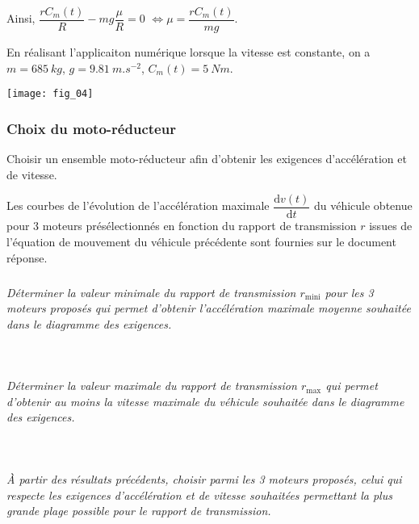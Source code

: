 \begin{multicols}{2}
\begin{corrige}
Ainsi, $\dfrac{rC_m(t)}{R}-mg\dfrac{\mu}{R}=0$ $ \Leftrightarrow \mu = \dfrac{rC_m(t)}{mg}$.

En réalisant l'applicaiton numérique lorsque la vitesse est constante, on a $m=\SI{685}{kg}$, $g=\SI{9,81}{m.s^{-2}}$, $C_m(t)=\SI{5}{Nm}$.
\end{corrige}
\else
\fi

\begin{center}
\texttt{[image: fig\_04]}
\end{center}


\subsubsection*{Choix du moto-réducteur}
\begin{obj}
Choisir un ensemble moto-réducteur afin d’obtenir les exigences d’accélération et de vitesse.
\end{obj}

Les courbes de l’évolution de l’accélération maximale $\dfrac{\text{d} v(t)}{\text{d} t}$
du véhicule obtenue pour 3 moteurs présélectionnés en fonction du rapport de transmission $r$ issues de l’équation de mouvement du véhicule précédente sont fournies sur le document réponse.




\subparagraph{}\textit{Déterminer la valeur minimale du rapport de transmission $r_{\text{mini}}$ pour les 3 moteurs proposés qui permet d’obtenir l’accélération maximale moyenne souhaitée dans le diagramme des exigences.}
\ifprof
\begin{corrige}~\\
\end{corrige}
\else
\fi


\subparagraph{}\textit{Déterminer la valeur maximale du rapport de transmission $r_{\text{max}}$ qui permet d’obtenir au moins la vitesse maximale du véhicule souhaitée dans le diagramme des exigences.}
\ifprof
\begin{corrige}~\\
\end{corrige}
\else
\fi


\subparagraph{}\textit{À partir des résultats précédents, choisir parmi les 3 moteurs proposés, celui qui respecte les exigences d’accélération et de vitesse souhaitées permettant la plus grande plage possible pour le rapport de transmission.}
\ifprof
\begin{corrige}~\\
\end{corrige}
\else
\fi



\end{multicols}
